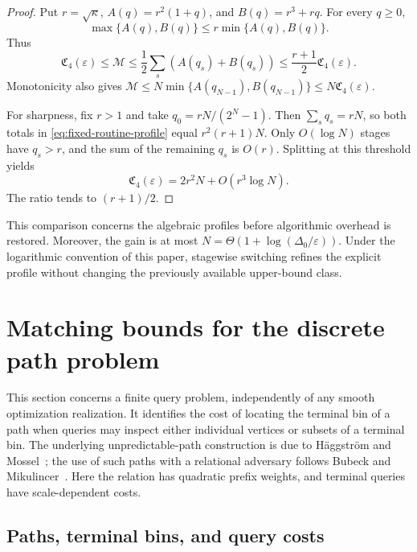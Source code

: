 \documentclass[11pt,a4paper]{article}
\newcommand{\eps}{\varepsilon}
\newcommand{\profile}{\mathfrak C_4}
\theoremstyle{definition}
\theoremstyle{remark}
\begin{document}
\begin{proof}
Put $r=\sqrt\kappa$, $A(q)=r^2(1+q)$, and
$B(q)=r^3+rq$.  For every $q\ge0$,
\[
 \max\{A(q),B(q)\}\le r\min\{A(q),B(q)\}.
\]
Thus
\[
 \profile(\eps)\le\mathcal M
 \le\frac12\sum_s(A(q_s)+B(q_s))
 \le\frac{r+1}{2}\profile(\eps).
\]
Monotonicity also gives
$\mathcal M\le N\min\{A(q_{N-1}),B(q_{N-1})\}
\le N\profile(\eps)$.

For sharpness, fix $r>1$ and take
$q_0=rN/(2^N-1)$.  Then $\sum_s q_s=rN$, so both totals in
\eqref{eq:fixed-routine-profile} equal $r^2(r+1)N$.
Only $O(\log N)$ stages have $q_s>r$, and the sum of the remaining
$q_s$ is $O(r)$.  Splitting at this threshold yields
\[
 \profile(\eps)=2r^2N+O(r^3\log N).
\]
The ratio tends to $(r+1)/2$.
\end{proof}

This comparison concerns the algebraic profiles before algorithmic
overhead is restored.  Moreover, the gain is at most
$N=\Theta(1+\log(\Delta_0/\eps))$.  Under the logarithmic convention
of this paper, stagewise switching refines the explicit profile
without changing the previously available upper-bound class.



\section{Matching bounds for the discrete path problem}
\label{sec:discrete}

This section concerns a finite query problem, independently of any smooth
optimization realization.  It identifies the cost of locating the terminal
bin of a path when queries may inspect either individual vertices or subsets
of a terminal bin.  The underlying unpredictable-path construction is due to
H\"aggstr\"om and Mossel~\cite{haggstrom1998}; the use of such paths with a
relational adversary follows Bubeck and Mikulincer~\cite[Appendix~B]{bubeck2020}.
Here the relation has quadratic prefix weights, and terminal queries have
scale-dependent costs.

\subsection{Paths, terminal bins, and query costs}
\end{document}
